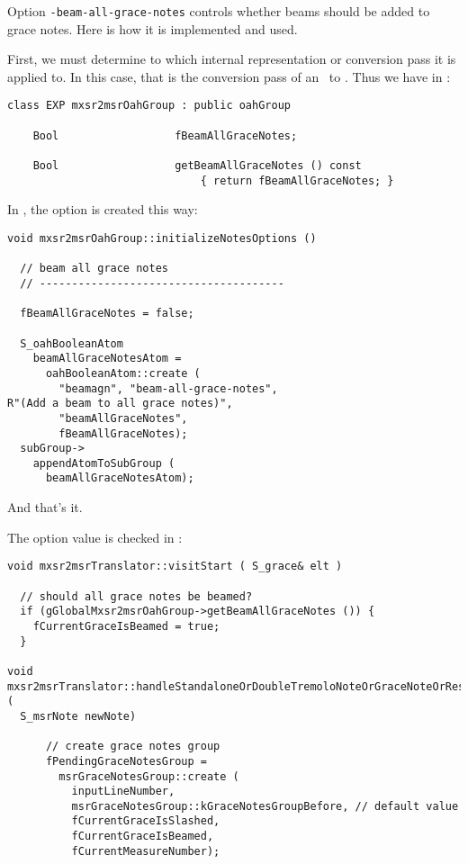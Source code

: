 {Option {\tt -beam-all-grace-notes} controls whether beams should be added to grace notes. Here is how it is implemented and used.

First, we must determine to which internal representation or conversion pass it is applied to. In this case, that is the conversion pass of an \mxsrRepr\ to \msrRepr.
Thus we have in :
\begin{lstlisting}[language=CPlusPlus]
class EXP mxsr2msrOahGroup : public oahGroup

    Bool                  fBeamAllGraceNotes;

    Bool                  getBeamAllGraceNotes () const
                              { return fBeamAllGraceNotes; }
\end{lstlisting}

In , the option is created this way:
\begin{lstlisting}[language=CPlusPlus]
void mxsr2msrOahGroup::initializeNotesOptions ()

  // beam all grace notes
  // --------------------------------------

  fBeamAllGraceNotes = false;

  S_oahBooleanAtom
    beamAllGraceNotesAtom =
      oahBooleanAtom::create (
        "beamagn", "beam-all-grace-notes",
R"(Add a beam to all grace notes)",
        "beamAllGraceNotes",
        fBeamAllGraceNotes);
  subGroup->
    appendAtomToSubGroup (
      beamAllGraceNotesAtom);
\end{lstlisting}

And that's it.

The option value is checked in :
\begin{lstlisting}[language=CPlusPlus]
void mxsr2msrTranslator::visitStart ( S_grace& elt )

  // should all grace notes be beamed?
  if (gGlobalMxsr2msrOahGroup->getBeamAllGraceNotes ()) {
    fCurrentGraceIsBeamed = true;
  }

void mxsr2msrTranslator::handleStandaloneOrDoubleTremoloNoteOrGraceNoteOrRest (
  S_msrNote newNote)

      // create grace notes group
      fPendingGraceNotesGroup =
        msrGraceNotesGroup::create (
          inputLineNumber,
          msrGraceNotesGroup::kGraceNotesGroupBefore, // default value
          fCurrentGraceIsSlashed,
          fCurrentGraceIsBeamed,
          fCurrentMeasureNumber);


\end{lstlisting}}
